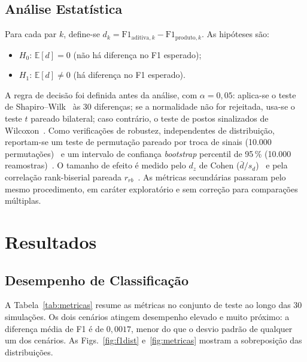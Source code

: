 \documentclass[conference]{IEEEtran}
\begin{document}
\subsection{Análise Estatística}
Para cada par $k$, define-se $d_k = \mathrm{F1}_{\text{aditiva},k} - \mathrm{F1}_{\text{produto},k}$. As hipóteses são:
\begin{itemize}
  \item $H_0$: $\mathbb{E}[d] = 0$ (não há diferença no F1 esperado);
  \item $H_1$: $\mathbb{E}[d] \neq 0$ (há diferença no F1 esperado).
\end{itemize}
A regra de decisão foi definida antes da análise, com $\alpha = 0,05$: aplica-se o teste de Shapiro--Wilk~\cite{shapiro1965} às 30 diferenças; se a normalidade não for rejeitada, usa-se o teste $t$ pareado bilateral; caso contrário, o teste de postos sinalizados de Wilcoxon~\cite{wilcoxon1945}. Como verificações de robustez, independentes de distribuição, reportam-se um teste de permutação pareado por troca de sinais (10.000 permutações)~\cite{good2005} e um intervalo de confiança \textit{bootstrap} percentil de 95\,\% (10.000 reamostras)~\cite{efron1993}. O tamanho de efeito é medido pelo $d_z$ de Cohen ($\bar{d}/s_d$)~\cite{cohen1988} e pela correlação rank-biserial pareada $r_{rb}$~\cite{kerby2014}. As métricas secundárias passaram pelo mesmo procedimento, em caráter exploratório e sem correção para comparações múltiplas.

\section{Resultados}
\label{sec:resultados}

\subsection{Desempenho de Classificação}
A Tabela~\ref{tab:metricas} resume as métricas no conjunto de teste ao longo das 30 simulações. Os dois cenários atingem desempenho elevado e muito próximo: a diferença média de F1 é de $0,0017$, menor do que o desvio padrão de qualquer um dos cenários. As Figs.~\ref{fig:f1dist} e~\ref{fig:metricas} mostram a sobreposição das distribuições.
\end{document}
